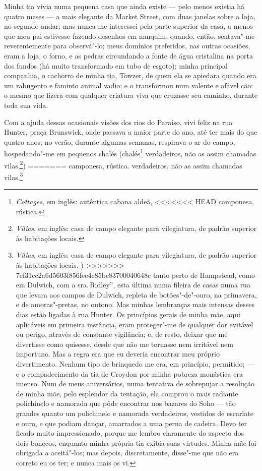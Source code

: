 {{{{{{{{{{%
Minha tia vivia numa pequena casa que ainda existe --- pelo menos
existia há quatro meses --- a mais elegante da Market Street, com duas
janelas sobre a loja, no segundo andar; mas nunca me interessei pela
parte superior da casa, a menos que meu pai estivesse fazendo desenhos
em nanquim, quando, então, sentava"-me reverentemente para observá"-lo;
meus domínios preferidos, nas outras ocasiões, eram a loja, o forno, e
as pedras circundando a fonte de água cristalina na porta dos fundos (há
muito transformado em tubo de esgoto); minha principal companhia, o
cachorro de minha tia, Towzer, de quem ela se apiedara quando era um
rabugento e faminto animal vadio; e o transformou num valente e afável
cão: o mesmo que fizera com qualquer criatura viva que cruzasse seu
caminho, durante toda sua vida.

Com a ajuda dessas ocasionais visões dos rios do Paraíso, vivi feliz
na rua Hunter, praça Brunswick, onde passava a maior parte do ano, até
ter mais do que quatro anos; no verão, durante algumas semanas,
respirava o ar do campo, hospedando"-me em pequenos chalés
(chalés\footnote{\textit{Cottages}, em inglês: autêntica cabana aldeã,
<<<<<<< HEAD
  camponesa, rústica.} verdadeiros, não as assim chamadas
vilas,\footnote{\textit{Villas}, em inglês: casa de campo elegante para
  vilegiatura, de padrão superior às habitações locais.})
=======
  camponesa, rústica.  verdadeiros, não as assim chamadas
vilas,\footnote{\textit{Villas}, em inglês: casa de campo elegante para
  vilegiatura, de padrão superior às habitações locais. )
>>>>>>> 7ef31cc2a6d5603f856fee4c85bc83700040648c
tanto perto de Hampstead, como em Dulwich, com a sra.\,Ridley'', esta
última numa fileira de casas numa rua que levara aos campos de Dulwich,
repleta de botões"-de"-ouro, na primavera, e de amoras"-pretas, no outono.
Mas minhas lembranças mais intensas desses dias estão ligadas à rua
Hunter. Os princípios gerais de minha mãe, aqui aplicáveis em primeira
instância, eram proteger"-me de qualquer dor evitável ou perigo, através
de constante vigilância; e, de resto, deixar que me divertisse como
quisesse, desde que não me tornasse nem irritável nem importuno. Mas a
regra era que eu deveria encontrar meu próprio divertimento. Nenhum tipo
de brinquedo me era, em princípio, permitido; --- e o compadecimento da
tia de Croydon por minha pobreza monástica era imenso. Num de meus
aniversários, numa tentativa de sobrepujar a resolução de minha mãe,
pelo esplendor da tentação, ela comprou o mais radiante polichinelo e
namorada que pôde encontrar nos bazares do Soho --- tão grandes quanto um
polichinelo e namorada verdadeiros, vestidos de escarlate e ouro, e que
podiam dançar, amarrados a uma perna de cadeira. Devo ter ficado muito
impressionado, porque me lembro claramente do aspecto dos dois bonecos,
enquanto minha própria tia exibia suas virtudes. Minha mãe foi obrigada
a aceitá"-los; mas depois, discretamente, disse"-me que não era correto eu
os ter; e nunca mais os vi.

}}}}}}}}}}}
